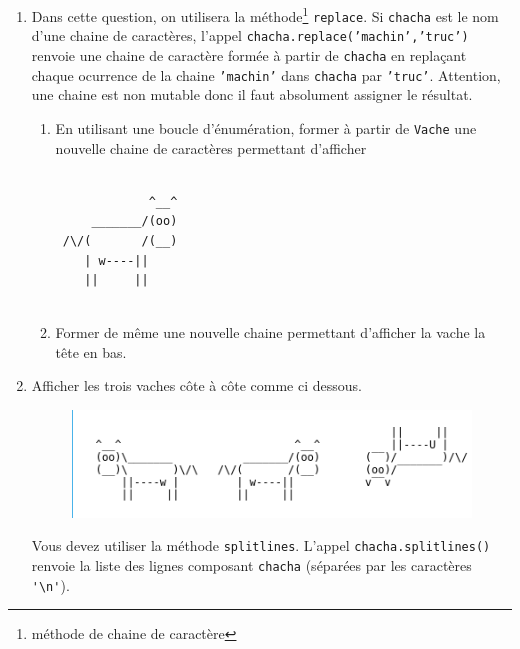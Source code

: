 \begin{enumerate}
\begin{enumerate}
 \item En utilisant \texttt{lili.append(truc)} pour insérer \texttt{truc} à la fin de la liste \texttt{lili} ainsi que \texttt{in} dans un test, former la liste de tous les numéros distincts des caractères qui forment \texttt{Vache}. En examinant la suite des caractères de \texttt{Vache}, Que pensez vous de celui de numéro 10? Est-il égal à la chaine de caractère \verb|'\n'|?
\end{enumerate}
\item Dans cette question, on utilisera la méthode\footnote{méthode de chaine de caractère} \texttt{replace}. Si \texttt{chacha} est le nom d'une chaine de caractères, l'appel \texttt{chacha.replace('machin','truc')} renvoie une chaine de caractère formée à partir de \texttt{chacha} en replaçant chaque ocurrence de la chaine \texttt{'machin'} dans \texttt{chacha} par  \texttt{'truc'}. Attention, une chaine est non mutable donc il faut absolument assigner le résultat.
\begin{enumerate}
 \item En utilisant une boucle d'énumération, former à partir de \texttt{Vache} une nouvelle chaine de caractères permettant d'afficher
\begin{verbatim}
  
             ^__^   
     _______/(oo)   
 /\/(       /(__)   
    | w----||       
    ||     ||       
   
\end{verbatim}
\item Former de même une nouvelle chaine permettant d'afficher la vache la tête en bas. 
\end{enumerate}
\item Afficher les trois vaches côte à côte comme ci dessous.
\begin{figure}[h]
 \centering
 \includegraphics{./Evachscii_1.png}
\end{figure}
\newline
Vous devez utiliser la méthode \texttt{splitlines}. L'appel \texttt{chacha.splitlines()} renvoie la liste des lignes composant \texttt{chacha} (séparées par les caractères \verb|'\n'|). 
\end{enumerate}
